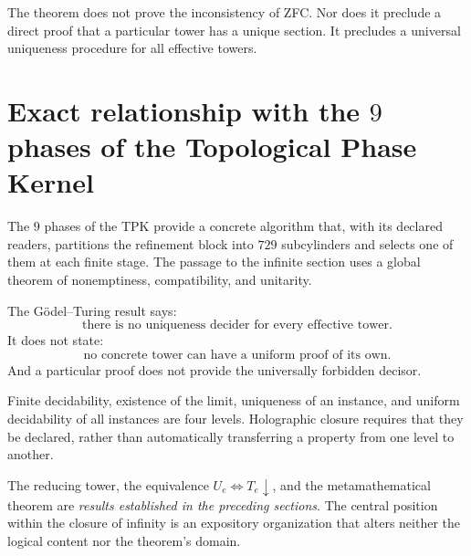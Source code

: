 \begin{remark}
The theorem does not prove the inconsistency of ZFC. Nor does it preclude a
direct proof that a particular tower has a unique section. It precludes a
universal uniqueness procedure for all effective towers.
\end{remark}

\section{Exact relationship with the \(9\) phases of the Topological Phase Kernel}

The \(9\) phases of the TPK provide a concrete algorithm that, with its declared readers,
partitions the refinement block into \(729\) subcylinders and selects one of them
at each finite stage.
The passage to the infinite section uses a global theorem of nonemptiness,
compatibility, and unitarity.

The Gödel--Turing result says:
\[
\text{there is no uniqueness decider for every effective tower}.
\]
It does not state:
\[
\text{no concrete tower can have a uniform proof of its own}.
\]
And a particular proof does not provide the universally forbidden decisor.


\begin{remark}
Finite decidability, existence of the limit, uniqueness of an instance, and uniform
decidability of all instances are four levels. Holographic closure
requires that they be declared, rather than automatically transferring a property from one
level to another.
\end{remark}

\begin{remark}
The reducing tower, the equivalence \(U_e\iff T_e\downarrow\), and the metamathematical
theorem are \emph{results established in the preceding sections}. The central position within
the closure of infinity is an expository organization that alters neither the logical content nor the theorem's domain.
\end{remark}

